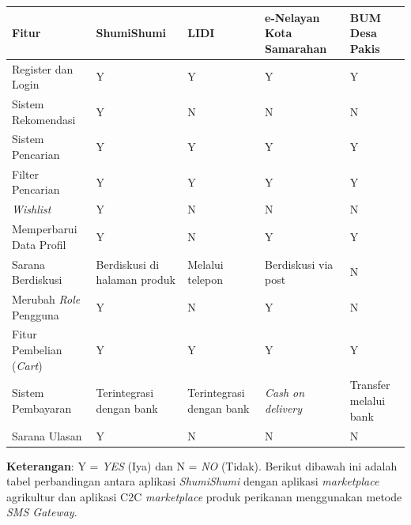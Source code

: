 \documentclass[a4paper]{article}
\begin{document}
\begin{itemize}
    \begin{centering}
    \begin{longtable}{|p{3cm}|p{2cm}|p{2cm}|p{3cm}|p{2cm}|}
        \hline
        Fitur & ShumiShumi & LIDI & e-Nelayan Kota Samarahan & BUM Desa Pakis\\
        \hline
        Register dan Login & Y & Y & Y & Y\\
        \hline
        Sistem Rekomendasi & Y & N & N & N\\
        \hline
        Sistem Pencarian & Y & Y & Y & Y\\
        \hline
        Filter Pencarian & Y & Y & Y & Y\\
        \hline
        \textit{Wishlist} & Y & N & N & N\\
        \hline
        Memperbarui Data Profil & Y & N & Y & Y\\
        \hline
        Sarana Berdiskusi & Berdiskusi di halaman produk & Melalui telepon & Berdiskusi via post & N\\
        \hline
        Merubah \textit{Role} Pengguna & Y & N & Y & N\\
        \hline
        Fitur Pembelian (\textit{Cart}) & Y & Y & Y & Y\\
        \hline
        Sistem Pembayaran & Terintegrasi dengan bank & Terintegrasi dengan bank & \textit{Cash on delivery} & Transfer melalui bank\\
        \hline
        Sarana Ulasan & Y & N & N & N\\
        \hline
    \end{longtable}
    \end{centering}

    \textbf{Keterangan}: Y = \textit{YES} (Iya) dan N = \textit{NO} (Tidak).
    \newpage
    Berikut dibawah ini adalah tabel perbandingan antara aplikasi \textit{ShumiShumi} dengan aplikasi \textit{marketplace} agrikultur\autocite{agriculture-marketplace} dan aplikasi C2C \textit{marketplace} produk perikanan menggunakan metode \textit{SMS Gateway}\autocite{c2c-fish-marketplace}.


\end{itemize}
\end{document}
